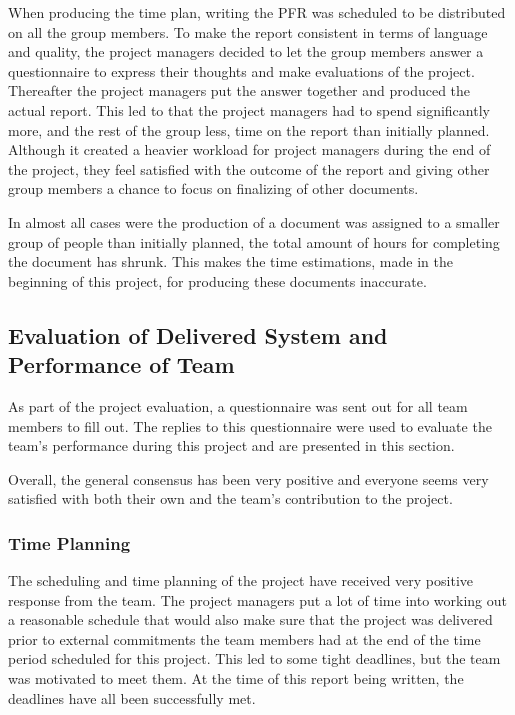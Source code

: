 \documentclass[a4paper]{article}
\begin{document}
When producing the time plan, writing the PFR was scheduled to be distributed on all the group members. To make the report consistent in terms of language and quality, the project managers decided to let the group members answer a questionnaire to express their thoughts  and make evaluations of the project. Thereafter the project managers put the answer together and produced the actual report. This led to that the project managers had to spend significantly more, and the rest of the group less, time on the report than initially planned. Although it created a heavier workload for project managers during the end of the project, they feel satisfied with the outcome of the report and giving other group members a chance to focus on finalizing of other documents.

In almost all cases were the production of a document was assigned to a smaller group of people than initially planned, the total amount of hours for completing the document has shrunk. This makes the time estimations, made in the beginning of this project, for producing these documents inaccurate. 




\subsection{Evaluation of Delivered System and Performance of Team}
\label{sec:teval}
As part of the project evaluation, a questionnaire was sent out for all team members to fill out. The replies to this questionnaire were used to evaluate the team's performance during this project and are presented in this section. 

Overall, the general consensus has been very positive and everyone seems very satisfied with both their own and the team's contribution to the project.



\subsubsection{Time Planning}
The scheduling and time planning of the project have received very positive response from the team. The project managers put a lot of time into working out a reasonable schedule that would also make sure that the project was delivered prior to external commitments the team members had at the end of the time period scheduled for this project. This led to some tight deadlines, but the team was motivated to meet them. At the time of this report being written, the deadlines have all been successfully met. 
\end{document}
